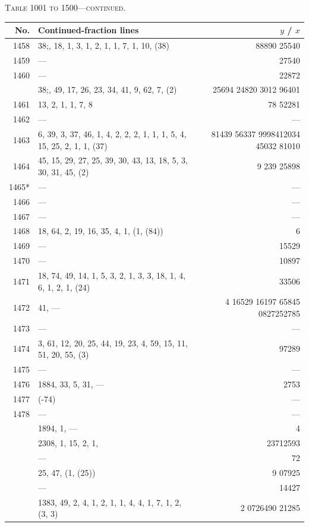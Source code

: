 \documentclass[11pt]{article}
\newcommand{\peheading}{%
  \begin{center}\small\textsc{Table 1001 to 1500---continued.}\end{center}
}
\begin{document}
\peheading
\renewcommand{\arraystretch}{1.15}
{\footnotesize
\begin{longtable}{|r|p{8.5cm}|r|}
\hline
\textbf{No.} & \textbf{Continued-fraction lines} & \textbf{$y$ \;/\; $x$}\\
\hline\endhead
1458   & $38$;\; 5, 18, 1, 3, 1, 2, 1, 1, 7, 1, 10, (38) & 88890 25540 \\
1459   & --- & 27540 \\
1460   & --- & 22872 \\
       & $38$;\; 1, 49, 17, 26, 23, 34, 41, 9, 62, 7, (2) & 25694 24820 3012 96401 \\
1461   & 13, 2, 1, 1, 7, 8 & 78 52281 \\
1462   & --- & --- \\
1463   & 6, 39, 3, 37, 46, 1, 4, 2, 2, 2, 1, 1, 1, 5, 4, 15, 25, 2, 1, 1, (37) & 81439 56337 9998412034 45032 81010 \\
1464   & 45, 15, 29, 27, 25, 39, 30, 43, 13, 18, 5, 3, 30, 31, 45, (2) & 9 239 25898 \\
1465*  & --- & --- \\
1466   & --- & --- \\
1467   & --- & --- \\
1468   & 18, 64, 2, 19, 16, 35, 4, 1, (1, (84)) & 6 \\
1469   & --- & 15529 \\
1470   & --- & 10897 \\
1471   & 18, 74, 49, 14, 1, 5, 3, 2, 1, 3, 3, 18, 1, 4, 6, 1, 2, 1, (24) & 33506 \\
1472   & 41, --- & 4 16529 16197 65845 0827252785 \\
1473   & --- & --- \\
1474   & 3, 61, 12, 20, 25, 44, 19, 23, 4, 59, 15, 11, 51, 20, 55, (3) & 97289 \\
1475   & --- & --- \\
1476   & 1884, 33, 5, 31, --- & 2753 \\
1477   & (-74) & --- \\
1478   & --- & --- \\
       & 1894, 1, --- & 4 \\
       & 2308, 1, 15, 2, 1, & 23712593 \\
       & --- & 72 \\
       & 25, 47, (1, (25)) & 9 07925 \\
       & --- & 14427 \\
       & 1383, 49, 2, 4, 1, 2, 1, 1, 4, 4, 1, 7, 1, 2, (3, 3) & 2 0726490 21285 \\

\end{longtable}}
\end{document}
